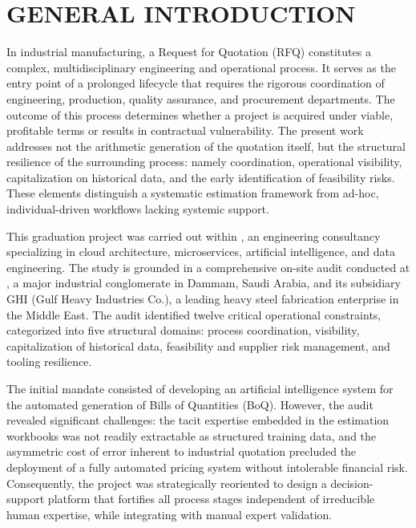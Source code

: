 \chapter*{GENERAL INTRODUCTION}
\adjustmtc
\thispagestyle{MyStyle}

In industrial manufacturing, a Request for Quotation (RFQ) constitutes a complex, multidisciplinary engineering and operational process. It serves as the entry point of a prolonged lifecycle that requires the rigorous coordination of engineering, production, quality assurance, and procurement departments. The outcome of this process determines whether a project is acquired under viable, profitable terms or results in contractual vulnerability. The present work addresses not the arithmetic generation of the quotation itself, but the structural resilience of the surrounding process: namely coordination, operational visibility, capitalization on historical data, and the early identification of feasibility risks. These elements distinguish a systematic estimation framework from ad-hoc, individual-driven workflows lacking systemic support.

This graduation project was carried out within \hostCompany, an engineering consultancy specializing in cloud architecture, microservices, artificial intelligence, and data engineering. The study is grounded in a comprehensive on-site audit conducted at \clientCompany, a major industrial conglomerate in Dammam, Saudi Arabia, and its subsidiary GHI (Gulf Heavy Industries Co.), a leading heavy steel fabrication enterprise in the Middle East. The audit identified twelve critical operational constraints, categorized into five structural domains: process coordination, visibility, capitalization of historical data, feasibility and supplier risk management, and tooling resilience.

The initial mandate consisted of developing an artificial intelligence system for the automated generation of Bills of Quantities (BoQ). However, the audit revealed significant challenges: the tacit expertise embedded in the estimation workbooks was not readily extractable as structured training data, and the asymmetric cost of error inherent to industrial quotation precluded the deployment of a fully automated pricing system without intolerable financial risk. Consequently, the project was strategically reoriented to design a decision-support platform that fortifies all process stages independent of irreducible human expertise, while integrating with manual expert validation.

